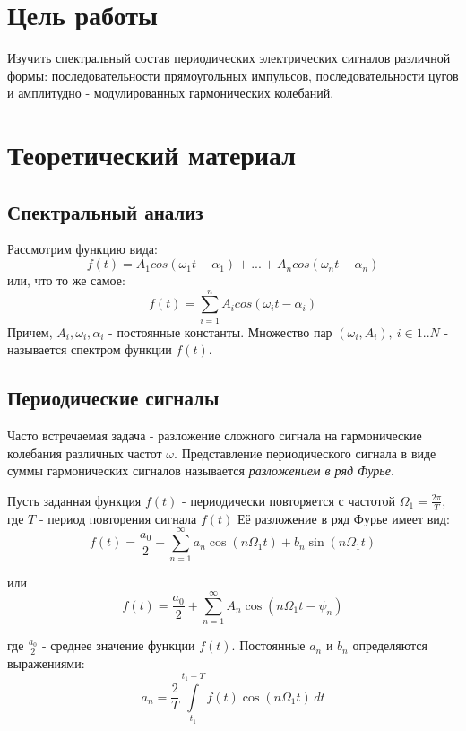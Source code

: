 \documentclass[a4paper, 12pt]{article}
\begin{document}

\section{Цель работы}

Изучить спектральный состав периодических электрических сигналов различной формы: последовательности прямоугольных импульсов, последовательности цугов и амплитудно - модулированных гармонических колебаний.

\section{Теоретический материал}

\subsection{Спектральный анализ}

Рассмотрим функцию вида:
$$f(t) = A_{1}cos(\omega_1t-\alpha_{1}) + ... + A_{n}cos(\omega_{n}t-\alpha_{n})$$
или, что то же самое:
$$f(t) = \sum\limits_{i=1}^n A_{i}cos(\omega_{i}t-\alpha_{i})$$
Причем, $A_{i}, \omega_{i}, \alpha_{i}$ - постоянные константы. Множество пар $(\omega_{i}, A_{i}), \: i \in 1..N$ - называется спектром функции $f(t)$.

\subsection{Периодические сигналы}

Часто встречаемая задача - разложение сложного сигнала на гармонические колебания различных частот $\omega$. Представление периодического сигнала в виде суммы гармонических сигналов называется {\it{разложением в ряд Фурье}}.

Пусть заданная функция $f(t)$ - периодически повторяется с частотой $\Omega_{1}=\frac{2\pi}{T}$, где $T$ - период повторения сигнала $f(t)$
Её разложение в ряд Фурье имеет вид:
\begin{equation}
\label{form:furie}	
	f(t)=\frac{a_{0}}{2}+\sum\limits_{n=1}^{\infty}a_{n}\cos(n\Omega_{1}t)+b_{n}\sin(n\Omega_{1}t) 
\end{equation}

или
\begin{equation}
	f(t)=\frac{a_{0}}{2}+\sum\limits_{n=1}^{\infty}A_{n}\cos(n\Omega_{1}t-\psi_{n}) 
\label{form:furie_2}
\end{equation}

где $\frac{a_{0}}{2}$ - среднее значение функции $f(t)$. Постоянные $a_n$ и $b_n$ определяются выражениями:
\begin{equation}
\label{form:a_n}
	a_{n} = \frac{2}{T}\int\limits_{t_{1}}^{t_{1}+T}f(t)\cos(n\Omega_1t)\, dt
\end{equation}
\end{document}
